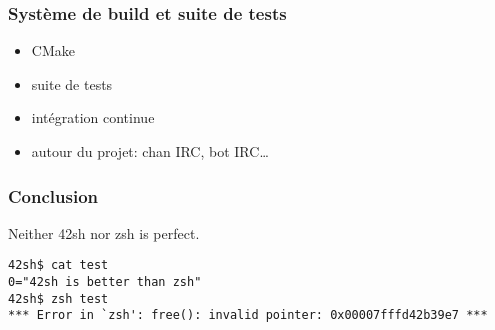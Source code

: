 \documentclass{beamer}
\begin{document}
\begin{frame}
    \frametitle{Système de build et suite de tests}
    \begin{itemize}
        \item CMake
        \item suite de tests
        \item intégration continue
        \item autour du projet: chan IRC, bot IRC\ldots
    \end{itemize}
\end{frame}

\begin{frame} [fragile]
    \frametitle{Conclusion}
    Neither 42sh nor zsh is perfect.
\begin{verbatim}
42sh$ cat test
0="42sh is better than zsh"
42sh$ zsh test
*** Error in `zsh': free(): invalid pointer: 0x00007fffd42b39e7 ***
\end{verbatim}
\end{frame}
\end{document}
